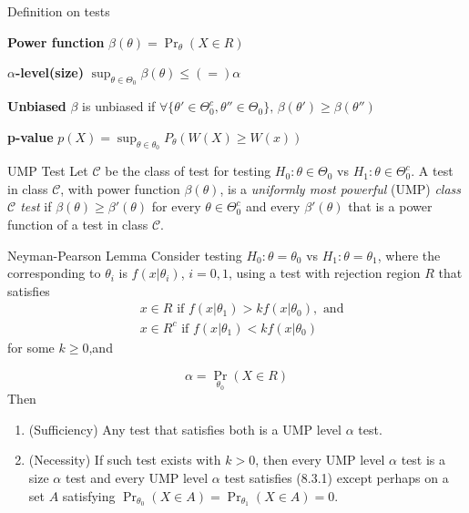 \documentclass{article}
\begin{document}
\begin{multicols*}{3}
\begin{thmbox}{Definition on tests}

{\bf Power function} $\beta(\theta) = \Pr_{\theta}(X\in R)$

{\bf $\alpha$-level(size)} $\sup_{\theta\in\Theta_0}\beta(\theta) \leq(=) \alpha$

{\bf Unbiased} $\beta$ is unbiased if $\forall\{\theta'\in \Theta_0^c, \theta''\in\Theta_0\},\, \beta(\theta') \geq \beta(\theta'')$

{\bf p-value} $p(X) = \sup_{\theta \in \theta_0}P_{\theta}(W(X) \ge W(x))$ 
\end{thmbox}

\begin{thmbox}{UMP Test}
Let $\mathcal{C}$ be the class of test for testing $H_0:\theta\in\Theta_0$ vs $H_1:\theta\in\Theta_0^c$. A test in class $\mathcal{C}$, with power function $\beta(\theta)$, is a {\it uniformly most powerful} (UMP) {\it class $\mathcal{C}$ test} if $\beta(\theta) \geq \beta'(\theta)$ for every $\theta\in\Theta_0^c$ and every $\beta'(\theta)$ that is a power function of a test in class $\mathcal{C}$.
\end{thmbox}

\begin{thmbox}{Neyman-Pearson Lemma}
Consider testing $H_0:\theta=\theta_0$ vs $H_1:\theta=\theta_1$, where the corresponding to $\theta_i$ is $f(x|\theta_i)$, $i=0,1$, using a test with rejection region $R$ that satisfies
\begin{equation}
\tag{8.3.1}
\begin{aligned}
&x\in R\mbox{ if }f(x|\theta_1) > kf(x|\theta_0), \mbox{ and} \\
&x\in R^c\mbox{ if }f(x|\theta_1) < kf(x|\theta_0)
\end{aligned}
\end{equation}
for some $k\geq 0$,and

\begin{equation}
\tag{8.3.2}
\alpha = \Pr_{\theta_0}(X\in R)
\end{equation}
Then
\begin{enumerate}
\item (Sufficiency) Any test that satisfies both is a UMP level $\alpha$ test.
\item (Necessity) If such test exists with $k>0$, then every UMP level $\alpha$ test is a size $\alpha$ test and every UMP level $\alpha$ test satisfies (8.3.1) except perhaps on a set $A$ satisfying $\Pr_{\theta_0}(X\in A) = \Pr_{\theta_1}(X\in A)=0$.
\end{enumerate}


\end{thmbox}
\end{multicols*}
\end{document}
